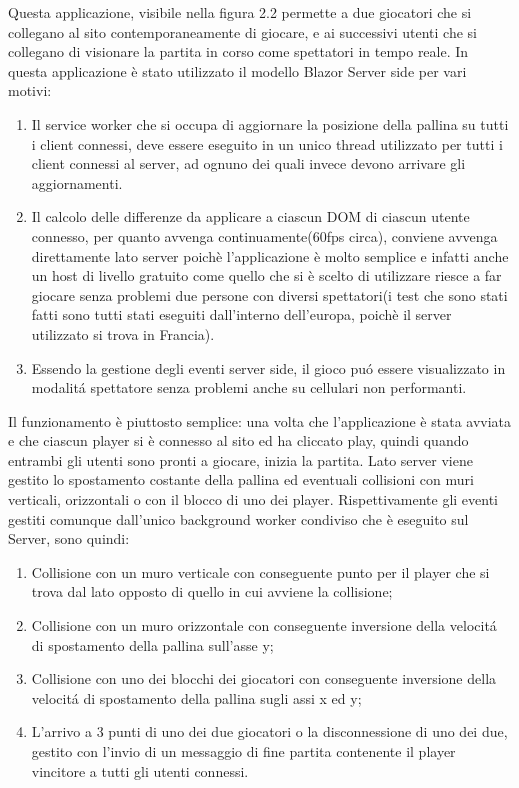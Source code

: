Questa applicazione, visibile nella figura 2.2 permette a due giocatori che si collegano al sito contemporaneamente di giocare, e ai successivi utenti che si collegano di visionare la partita in corso come spettatori in tempo reale.
In questa applicazione \`e stato utilizzato il modello Blazor Server side per vari motivi:
\begin{enumerate}
	\item Il service worker che si occupa di aggiornare la posizione della pallina su tutti i client connessi, deve essere eseguito in un unico thread utilizzato per tutti i client connessi al server, ad ognuno dei quali invece devono arrivare gli aggiornamenti.
	\item Il calcolo delle differenze da applicare a ciascun DOM di ciascun utente connesso, per quanto avvenga continuamente(60fps circa), conviene avvenga direttamente lato server poich\`e l'applicazione \`e molto semplice e infatti anche un host di livello gratuito come quello che si \`e scelto di utilizzare riesce a far giocare senza problemi due persone con diversi spettatori(i test che sono stati fatti sono tutti stati eseguiti dall'interno dell'europa, poich\`e il server utilizzato si trova in Francia).
	\item Essendo la gestione degli eventi server side, il gioco pu\'o essere visualizzato in modalit\'a spettatore senza problemi anche su cellulari non performanti.	
\end{enumerate}

Il funzionamento \`e piuttosto semplice: una volta che l'applicazione \`e stata avviata e che ciascun player si \`e connesso al sito ed ha cliccato play, quindi quando entrambi gli utenti sono pronti a giocare, inizia la partita.
Lato server viene gestito lo spostamento costante della pallina ed eventuali collisioni con muri verticali, orizzontali o con il blocco di uno dei player.
Rispettivamente gli eventi gestiti comunque dall'unico background worker condiviso che \`e eseguito sul Server, sono quindi:
\begin{enumerate}
	\item Collisione con un muro verticale con conseguente punto per il player che si trova dal lato opposto di quello in cui avviene la collisione;
	\item Collisione con un muro orizzontale con conseguente inversione della velocit\'a di spostamento della pallina sull'asse y;
	\item Collisione con uno dei blocchi dei giocatori con conseguente inversione della velocit\'a di spostamento della pallina sugli assi x ed y;
	\item L'arrivo a 3 punti di uno dei due giocatori o la disconnessione di uno dei due, gestito con l'invio di un messaggio di fine partita contenente il player vincitore a tutti gli utenti connessi.
\end{enumerate}

